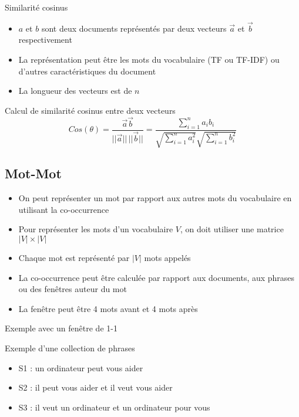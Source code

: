 \documentclass{KodeBook}
\begin{document}
Similarité cosinus
\begin{minipage}{.68\textwidth}
	\begin{itemize}
		\item $a$ et $b$ sont deux documents représentés par deux vecteurs $\overrightarrow{a}$ et $\overrightarrow{b}$ respectivement
		\item La représentation peut être les mots du vocabulaire (TF ou TF-IDF) ou d'autres caractéristiques du document
		\item La longueur des vecteurs est de $n$
	\end{itemize}
\end{minipage}
\begin{minipage}{.3\textwidth}
\end{minipage}

\begin{block}{Calcul de similarité cosinus entre deux vecteurs}
	\[
	Cos(\theta) = \frac{\overrightarrow{a} \overrightarrow{b}}{||\overrightarrow{a}||\, ||\overrightarrow{b}||}
	= \frac{\sum_{i=1}^{n} a_i b_i}{\sqrt{\sum_{i=1}^{n} a_i^2} \sqrt{\sum_{i=1}^{n} b_i^2}}
	\]
\end{block}

\subsection{Mot-Mot}

\begin{itemize}
	\item On peut représenter un mot par rapport aux autres mots du vocabulaire en utilisant la co-occurrence
	\item Pour représenter les mots d'un vocabulaire $ V $, on doit utiliser une matrice $|V| \times |V|$
	\item Chaque mot est représenté par $|V|$ mots appelés 
	\item La co-occurrence peut être calculée par rapport aux documents, aux phrases ou des fenêtres auteur du mot
	\item La fenêtre peut être 4 mots avant et 4 mots après
\end{itemize}

Exemple avec un fenêtre de 1-1

\begin{exampleblock}{Exemple d'une collection de phrases}
	\begin{itemize}
		\item S1 : un ordinateur peut vous aider
		\item S2 : il peut vous aider et il veut vous aider
		\item S3 : il veut un ordinateur et un ordinateur pour vous
	\end{itemize}
\end{exampleblock}
\end{document}
